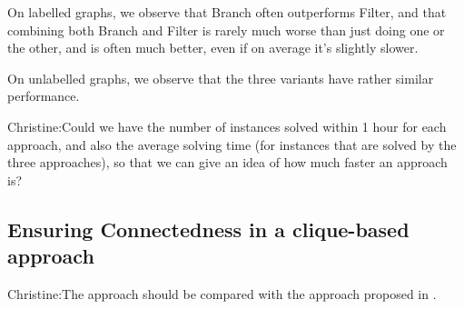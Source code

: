 \documentclass{llncs}
\newcommand{\christine}[1]{{\color{green} Christine:#1}}
\begin{document}
On labelled graphs, we observe that Branch often outperforms Filter, and that combining both Branch and Filter is rarely much worse than just doing one or the other, and is often much better, even if on average it's slightly slower.

On unlabelled graphs, we observe that the three variants have rather similar performance.

\christine{Could we have the number of instances solved within 1 hour for each approach, and also the average solving time (for instances that are solved by the three approaches), so that we can give an idea of how much faster an approach is?}

\subsection{Ensuring Connectedness in a clique-based approach}\label{mccs-clique}

\christine{The approach should be compared with the approach proposed in \cite{DBLP:conf/mco/VismaraV08}.}
\end{document}
